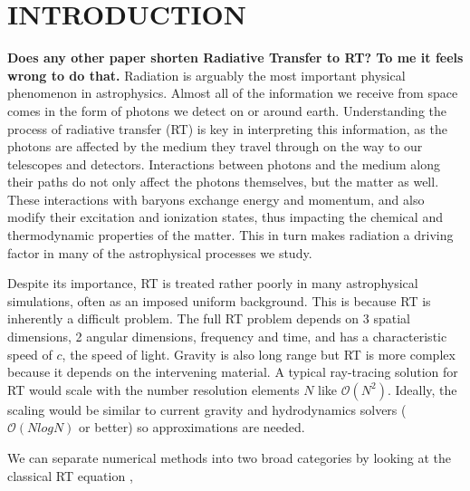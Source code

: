 \documentclass[fleqn,usenatbib]{mnras}
\begin{document}
\section{INTRODUCTION}\label{sec:intro}

{\bf Does any other paper shorten Radiative Transfer to RT? To me it feels wrong to do that.}
Radiation is arguably the most important physical phenomenon in 
astrophysics. Almost all of the information we receive from space comes 
in the form of photons we detect on or around earth.  Understanding the process 
of radiative transfer (RT) is key in interpreting this information, as the 
photons are affected by the medium they travel through on the way to our 
telescopes and detectors. Interactions between photons and the medium along
 their paths do not only affect the photons themselves, but the matter as well.
 These interactions with baryons exchange energy and momentum, and also modify
 their excitation and ionization states, thus impacting the 
chemical and thermodynamic properties of the matter. This in turn makes 
radiation a driving factor in many of the astrophysical processes we study.

Despite its importance, RT is treated rather poorly in many
 astrophysical simulations, often as an imposed uniform background. This 
is because RT is inherently a difficult problem. 
The full RT problem depends on 3 spatial dimensions, 2 
angular dimensions, frequency and time, and has a characteristic speed of $c$, 
the speed of light.  Gravity is also long range but RT is more complex because
 it depends on the intervening material.  A typical
ray-tracing solution for RT would scale with the number resolution elements $N$ 
like $\mathcal{O}(N^2)$.  Ideally, the scaling would be similar to current gravity and hydrodynamics
solvers ($\mathcal{O}(NlogN)$ or better) so approximations are needed.

We can separate numerical methods into two broad
categories by looking at the classical RT equation 
\citep{mihalasMihalas84},
\end{document}
